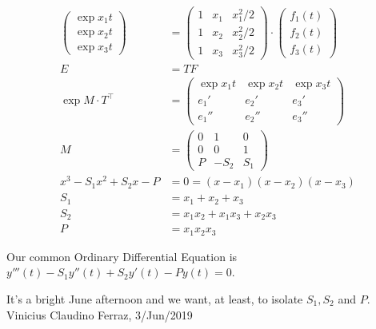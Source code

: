 \documentclass[10pt,a4paper]{article}
\begin{document}
\begin{align}
\left(\begin{matrix}\exp{x_1 t} \\ \exp{x_2 t} \\ \exp{x_3 t} \end{matrix}\right) &= \left(\begin{matrix}1 & x_1 & {x_1^2}/{2}  \\ 1 & x_2 & {x_2^2}/{2} \\ 1 & x_3 & {x_3^2}/{2} \end{matrix}\right) \cdot \left(\begin{matrix}f_1(t) \\ f_2(t) \\ f_3(t) \end{matrix}\right) \\
E &= T F \\
\exp M \cdot T^\top &= \left(\begin{matrix}\exp{x_1 t} & \exp{x_2 t} & \exp{x_3 t} \\ e_1' & e_2' & e_3'  \\ e_1'' & e_2'' & e_3'' \end{matrix}\right) \\
M &= \left(\begin{matrix}0 & 1 & 0  \\ 0 & 0 & 1 \\ P & -S_2 & S_1 \end{matrix}\right) \\
x^3 - S_1 x^2 + S_2 x - P &= 0 = (x - x_1)(x - x_2)(x - x_3) \\
S_1 &= x_1 + x_2 + x_3 \\
S_2 &= x_1 x_2 + x_1 x_3 + x_2 x_3 \\
P &= x_1 x_2 x_3
\end{align}

Our common Ordinary Differential Equation is $y'''(t) - S_1 y''(t) + S_2 y'(t) - P y(t) = 0$.

\vspace{3mm}

It's a bright June afternoon and we want, at least, to isolate $S_1, S_2$ and $P$. Vinicius Claudino Ferraz, 3/Jun/2019
\end{document}
